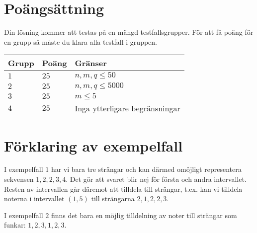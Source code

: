 \section*{Poängsättning}
Din lösning kommer att testas på en mängd testfallsgrupper. För att få poäng för en grupp så måste du klara alla testfall i gruppen.


\noindent
\begin{tabular}{| l | l | p{12cm} |}
  \hline
  \textbf{Grupp} & \textbf{Poäng} & \textbf{Gränser} \\ \hline
  $1$    & $25$      & $n,m,q \le 50$ \\ \hline
  $2$    & $25$      & $n,m,q \le 5000$ \\ \hline
  $3$    & $25$      & $m \le 5$  \\ \hline
  $4$    & $25$      & Inga ytterligare begränsningar \\ \hline
\end{tabular}

\section*{Förklaring av exempelfall}
I exempelfall $1$ har vi bara tre strängar och kan därmed omöjligt representera sekvensen $1, 2, 2, 3, 4$.
Det gör att svaret blir nej för första och andra intervallet.
Resten av intervallen går däremot att tilldela till strängar, t.ex. kan vi tilldela noterna i intervallet $(1, 5)$ till strängarna $2, 1, 2, 2, 3$.

I exempelfall $2$ finns det bara en möjlig tilldelning av noter till strängar som funkar: $1, 2, 3, 1, 2, 3$.
